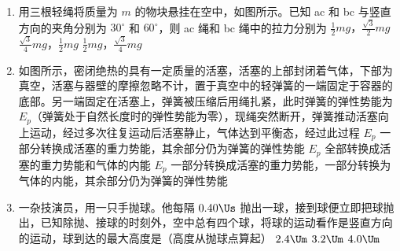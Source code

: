 \documentclass[\gkver]{gaokaozhenti}
\begin{document}
\begin{enumerate}
\item
用三根轻绳将质量为 $m$ 的物块悬挂在空中，如图所示。已知 ac 和 bc 与竖直方向的夹角分别为 $30^{\circ}$ 和 $60^{\circ}$，则 ac 绳和 bc 绳中的拉力分别为
\onepicture[h=2.72cm]{}
{$\frac{1}{2}mg$，$\frac{\sqrt{3}}{2}mg$}
{$\frac{\sqrt{3}}{4}mg$，$\frac{1}{2}mg$}
{$\frac{1}{2}mg$，$\frac{\sqrt{3}}{4}mg$}

\item
如图所示，密闭绝热的具有一定质量的活塞，活塞的上部封闭着气体，下部为真空，活塞与器壁的摩擦忽略不计，置于真空中的轻弹簧的一端固定于容器的底部。另一端固定在活塞上，弹簧被压缩后用绳扎紧，此时弹簧的弹性势能为 $E_{p}$（弹簧处于自然长度时的弹性势能为零），现绳突然断开，弹簧推动活塞向上运动，经过多次往复运动后活塞静止，气体达到平衡态，经过此过程
\onepicture[w=3.34cm]{}
{$E_{p}$ 一部分转换成活塞的重力势能，其余部分仍为弹簧的弹性势能}
{$E_{p}$ 全部转换成活塞的重力势能和气体的内能}
{$E_{p}$ 一部分转换成活塞的重力势能，一部分转换为气体的内能，其余部分仍为弹簧的弹性势能}

\item
一杂技演员，用一只手抛球。他每隔 $0.40\Us$ 抛出一球，接到球便立即把球抛出，已知除抛、接球的时刻外，空中总有四个球，将球的运动看作是竖直方向的运动，球到达的最大高度是（高度从抛球点算起）
\fourchoices[answer=C]
{$1.6\Um$}
{$2.4\Um$}
{$3.2\Um$}
{$4.0\Um$}
\end{enumerate}
\end{document}
